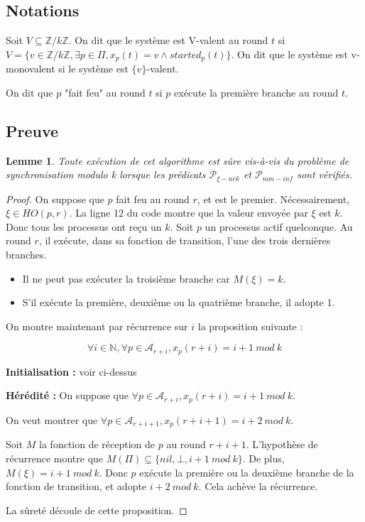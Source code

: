 \documentclass{article}
\newtheorem{lemma}{Lemme}[section]
\begin{document}
\subsection{Notations}

Soit $V \subseteq \mathds{Z}/k\mathds{Z}$. On dit que le système est V-valent au round $t$ si $V = \{v \in \mathds{Z}/k\mathds{Z}, \exists p \in \Pi, x_p(t) = v \wedge started_p(t)\}$.
On dit que le système est v-monovalent si le système est $\{v\}$-valent.

On dit que $p$ "fait feu" au round $t$ si $p$ exécute la première branche au round $t$.

\subsection{Preuve}

\begin{lemma}
	Toute exécution de cet algorithme est sûre vis-à-vis du problème de synchronisation modulo k lorsque les prédicats $\mathcal{P}_{\xi-nek}$ et $\mathcal{P}_{non-inf}$ sont vérifiés.
\end{lemma}
\begin{proof}

	On suppose que $p$ fait feu au round $r$, et est le premier. Nécessairement, $\xi \in HO(p,r)$.
	La ligne 12 du code montre que la valeur envoyée par $\xi$ est $k$.
	Donc tous les processus ont reçu un $k$. Soit $p$ un processus actif quelconque. Au round $r$, il exécute, dans sa fonction de transition, l'une des trois dernières branches.
	\begin{itemize}

		\item Il ne peut pas exécuter la troisième branche car $M(\xi) = k$.
		\item S'il exécute la première, deuxième ou la quatrième branche, il adopte 1.

	\end{itemize}

	On montre maintenant par récurrence sur $i$ la proposition suivante :

	$$\forall i \in \mathds{N}, \forall p \in \mathcal{A}_{r+i}, x_p(r+i) = i+1~mod~k$$

	\textbf{Initialisation : } voir ci-dessus

	\textbf{Hérédité :}
	On suppose que $\forall p \in \mathcal{A}_{r+i}, x_p(r+i) = i+1~mod~k$.

	On veut montrer que $\forall p \in \mathcal{A}_{r+i+1}, x_p(r+i+1) = i+2~mod~k$.

	Soit $M$ la fonction de réception de $p$ au round $r+i+1$.
	L'hypothèse de récurrence montre que $M(\Pi) \subseteq \{nil, \bot, i+1~mod~k\}$.
	De plus, $M(\xi) = i+1~mod~k$. Donc $p$ exécute la première ou la deuxième branche de la fonction de transition, et adopte $i+2~mod~k$.
	Cela achève la récurrence.

	La sûreté découle de cette proposition.

\end{proof}
\end{document}
